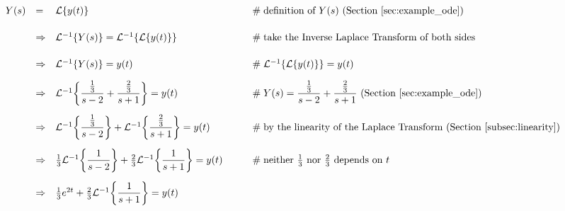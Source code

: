 \documentclass{article}
\theoremstyle{definition}
\begin{document}
\bigskip
\begin{equation*}
\begin{array}{lllll}
Y(s)                                                                                                                           
&=& \mathcal{L}\{y(t)\}                                                                                                   &\qquad \mathrel{\#} \text{definition of $Y(s)$ (Section \ref{sec:example_ode})}                                                        \\
[15pt]
 & \Rightarrow& \mathcal{L}^{-1}\{Y(s) \}  = \mathcal{L}^{-1}\{\mathcal{L}\{y(t)\}\}         &\qquad \mathrel{\#} \text{take the Inverse Laplace Transform of both sides}                                                            \\
[15pt]
&\Rightarrow& \mathcal{L}^{-1}\{Y(s) \}  = y(t)                                                               &\qquad \mathrel{\#}  \mathcal{L}^{-1}\{\mathcal{L}\{y(t)\}\} = y(t)                                                                                \\
[10pt]
&\Rightarrow& \mathcal{L}^{-1} \bigg \{ \mathlarger{\frac{\frac{1}{3}}{s-2}} + \mathlarger{\frac{\frac{2}{3}}{s+1}} \bigg \}  = y(t)
                                          &\qquad \mathrel{\#} Y(s) = \mathlarger{\frac{\frac{1}{3}}{s-2}} + \mathlarger{\frac{\frac{2}{3}}{s+1}} \text{ (Section \ref{sec:example_ode})}                                                        \\
[15pt]
&\Rightarrow& \mathcal{L}^{-1}\bigg \{\mathlarger{\frac{\frac{1}{3}}{s-2}} \bigg \} + \mathcal{L}^{-1}\bigg \{ \mathlarger{\frac{\frac{2}{3}}{s+1}} \bigg \} = y(t)
                                                                                                                                       &\qquad \mathrel{\#} \text{by the linearity of the Laplace Transform (Section \ref{subsec:linearity})}                         \\
[15pt]
&\Rightarrow& \frac{1}{3} \mathcal{L}^{-1}\bigg \{\mathlarger{\frac{1}{s-2}} \bigg \} + \frac{2}{3} \mathcal{L}^{-1}\bigg \{ \mathlarger{\frac{1}{s+1}} \bigg \}  = y(t)
                                                                                                                                       &\qquad \mathrel{\#} \text{neither $\frac{1}{3}$ nor $\frac{2}{3}$ depends on $t$}                                                     \\
[15pt]
&\Rightarrow& \frac{1}{3} e^{2t} +  \frac{2}{3} \mathcal{L}^{-1}\bigg \{ \mathlarger{\frac{1}{s+1}} \bigg \}  = y(t)

\end{array}
\end{equation*}
\end{document}

